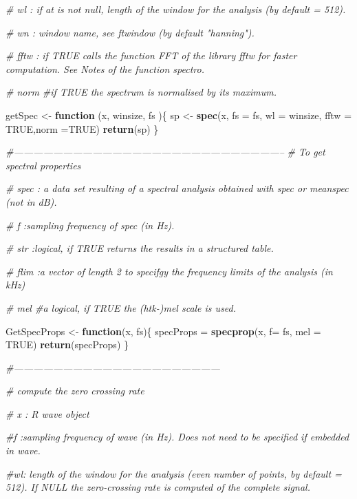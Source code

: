 \documentclass[]{article}
\newenvironment{Shaded}{\begin{snugshade}}{\end{snugshade}}
\newcommand{\KeywordTok}[1]{\textcolor[rgb]{0.13,0.29,0.53}{\textbf{#1}}}
\newcommand{\DataTypeTok}[1]{\textcolor[rgb]{0.13,0.29,0.53}{#1}}
\newcommand{\StringTok}[1]{\textcolor[rgb]{0.31,0.60,0.02}{#1}}
\newcommand{\CommentTok}[1]{\textcolor[rgb]{0.56,0.35,0.01}{\textit{#1}}}
\newcommand{\OtherTok}[1]{\textcolor[rgb]{0.56,0.35,0.01}{#1}}
\newcommand{\ControlFlowTok}[1]{\textcolor[rgb]{0.13,0.29,0.53}{\textbf{#1}}}
\newcommand{\NormalTok}[1]{#1}
\begin{document}
\begin{Shaded}
\begin{Highlighting}[]
\CommentTok{# wl    : if at is not null, length of the window for the analysis (by default = 512).}

\CommentTok{# wn     : window name, see ftwindow (by default "hanning").}

\CommentTok{# fftw : if TRUE calls the function FFT of the library fftw for faster computation. See Notes of the function spectro.}

\CommentTok{# norm  #if TRUE the spectrum is normalised by its maximum.}

\NormalTok{getSpec <-}\StringTok{ }\ControlFlowTok{function}\NormalTok{ (x, winsize, fs )\{}
\NormalTok{  sp  <-}\StringTok{ }\KeywordTok{spec}\NormalTok{(x,  }\DataTypeTok{fs =}\NormalTok{ fs, }\DataTypeTok{wl =}\NormalTok{ winsize, }\DataTypeTok{fftw =} \OtherTok{TRUE}\NormalTok{,}\DataTypeTok{norm  =}\OtherTok{TRUE}\NormalTok{)}
  \KeywordTok{return}\NormalTok{(sp)}
\NormalTok{\}}

\CommentTok{#-----------------------------------------------------------------------------------}
\CommentTok{# To get spectral properties }

\CommentTok{# spec  : a data set resulting of a spectral analysis obtained with spec or meanspec (not in dB).}

\CommentTok{# f  :sampling frequency of spec (in Hz).}

\CommentTok{# str   :logical, if TRUE returns the results in a structured table.}

\CommentTok{# flim  :a vector of length 2 to specifgy the frequency limits of the analysis (in kHz)}

\CommentTok{# mel   #a logical, if TRUE the (htk-)mel scale is used.}

\NormalTok{GetSpecProps <-}\StringTok{ }\ControlFlowTok{function}\NormalTok{(x, fs)\{}
\NormalTok{  specProps =}\StringTok{ }\KeywordTok{specprop}\NormalTok{(x, }\DataTypeTok{f=}\NormalTok{ fs, }\DataTypeTok{mel =} \OtherTok{TRUE}\NormalTok{)}
  \KeywordTok{return}\NormalTok{(specProps)}
\NormalTok{\}}

\CommentTok{#---------------------------------------------------------------}

\CommentTok{# compute the zero crossing rate}

\CommentTok{# x :  R wave object    }


\CommentTok{#f :sampling frequency of wave (in Hz). Does not need to be specified if embedded in wave.}

\CommentTok{#wl: length of the window for the analysis (even number of points, by default = 512). If NULL the zero-crossing rate is computed of the complete signal.}


\end{Highlighting}
\end{Shaded}
\end{document}
